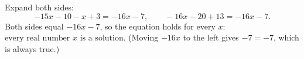 Expand both sides:
\[-15x-10-x+3=-16x-7,\qquad -16x-20+13=-16x-7.\]
Both sides equal $-16x-7$, so the equation holds for every $x$: $\boxed{\text{every real number }x\text{ is a solution}}$. (Moving $-16x$ to the left gives $-7=-7$, which is always true.)
